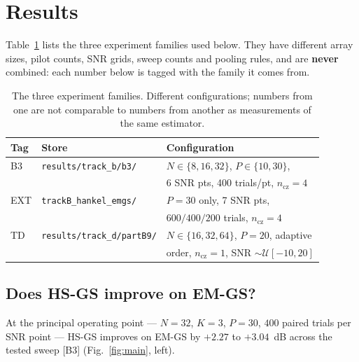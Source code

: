 \documentclass[conference]{IEEEtran}
\begin{document}
\section{Results}\label{sec:results}

Table~\ref{tab:fam} lists the three experiment families used below. They have
different array sizes, pilot counts, SNR grids, sweep counts and pooling rules,
and are \textbf{never} combined: each number below is tagged with the family it
comes from.

\begin{table}[!t]
\caption{The three experiment families. Different configurations; numbers from
one are not comparable to numbers from another as measurements of the same
estimator.}
\label{tab:fam}
\centering
\scriptsize
\setlength{\tabcolsep}{3pt}
\begin{tabular}{lll}
\toprule
Tag & Store & Configuration \\
\midrule
B3 & \texttt{results/track\_b/b3/} &
$N\!\in\!\{8,16,32\}$, $P\!\in\!\{10,30\}$, \\
 & & 6 SNR pts, 400 trials/pt, $n_{\mathrm{cz}}\!=\!4$ \\[2pt]
EXT & \texttt{trackB\_hankel\_emgs/} &
$P\!=\!30$ only, 7 SNR pts, \\
 & & $600/400/200$ trials, $n_{\mathrm{cz}}\!=\!4$ \\[2pt]
TD & \texttt{results/track\_d/partB9/} &
$N\!\in\!\{16,32,64\}$, $P\!=\!20$, adaptive \\
 & & order, $n_{\mathrm{cz}}\!=\!1$, SNR $\sim\mathcal{U}[-10,20]$ \\
\bottomrule
\end{tabular}
\end{table}

\subsection{Does HS-GS improve on EM-GS?}

At the principal operating point --- $N=32$, $K=3$, $P=30$, $400$ paired trials
per SNR point --- HS-GS improves on EM-GS by
$+2.27$ to $+3.04$~dB across the tested sweep [B3]
(Fig.~\ref{fig:main}, left).
\end{document}
